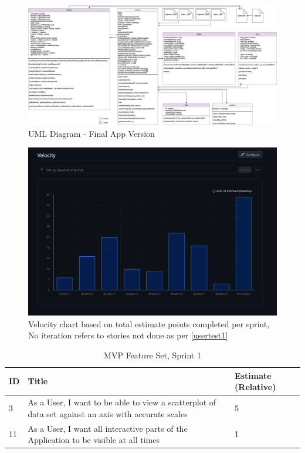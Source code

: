 
\begin{figure}[h]
    \centering
    \includegraphics[width=1\textwidth]{author-files/figures/UML_All_fin.drawio.png}
    \caption{UML Diagram - Final App Version}
    \label{fig:graphfin}
\end{figure}

\begin{figure}[h]
    \centering
    \includegraphics[width=1\columnwidth]{author-files/figures/velocity chart.PNG}
    \caption{Velocity chart based on total estimate points completed per sprint, No iteration refers to stories not done as per \ref{usertest1}}
    \label{fig:vel}
\end{figure}

\begin{table}[h]
    \begin{tabularx}{\textwidth}{ | X | X | X | }
        \hline
        ID & Title                                                                                               & Estimate (Relative) \\
        \hline
        3  & As a User, I want to be able to view a scatterplot of data set against an axis with accurate scales & 5                   \\
        \hline
        11 & As a User, I want all interactive parts of the Application to be visible at all times               & 1                   \\
        \hline
    \end{tabularx}
    \caption{MVP Feature Set, Sprint 1}
    \label{sprint1}
\end{table}


